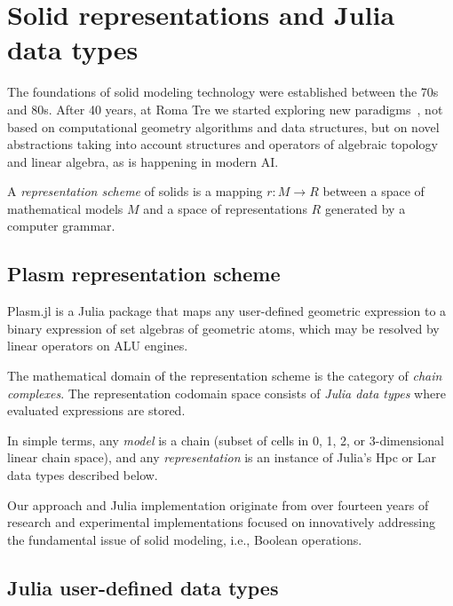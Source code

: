 \documentclass{juliacon}
\begin{document}
\section{Solid representations and Julia data types}
\label{sec:additional_doc}

The foundations of solid modeling technology were established between the 70s and 80s. After 40 years, at Roma Tre we started exploring new paradigms~\cite{DBLP:journals/cad/DiCarloPS14,TSAS:2020,PAOLUZZI2023103436}, not based on computational geometry algorithms and data structures, but on novel abstractions taking into account structures and operators of algebraic topology and linear algebra, as is happening in modern AI.

A \emph{representation scheme} of solids is a mapping $r: M \to R$ between a space of mathematical models $M$ and a space of representations $R$ generated by a computer grammar.

\subsection{Plasm representation scheme}
\label{subsec:additional_doc}

Plasm.jl is a Julia package that maps any user-defined geometric expression to a binary expression of set algebras of geometric atoms, which may be resolved by linear operators on ALU engines. 

The mathematical domain of the representation scheme is the category of \emph{chain complexes}. The representation codomain space consists of \emph{Julia data types} where evaluated expressions are stored.

In simple terms, any \emph{model} is a chain (subset of cells in 0, 1, 2, or 3-dimensional linear chain space), and any \emph{representation} is an instance of Julia’s Hpc or Lar data types described below.

Our approach and Julia implementation originate from over fourteen years of research and experimental implementations focused on innovatively addressing the fundamental issue of solid modeling, i.e., Boolean operations. 


\subsection{Julia user-defined data types}
\label{subsec:title_auth}
\end{document}
